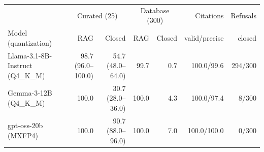 \begin{tabular}{lrrrrrr}
\toprule
 & \multicolumn{2}{c}{Curated (25)} & \multicolumn{2}{c}{Database (300)} & Citations & Refusals \\
Model (quantization) & RAG & Closed & RAG & Closed & valid/precise & closed \\
\midrule
Llama-3.1-8B-Instruct (Q4\_K\_M) & 98.7 (96.0--100.0) & 54.7 (48.0--64.0) & 99.7 & 0.7 & 100.0/99.6 & 294/300 \\
Gemma-3-12B (Q4\_K\_M) & 100.0 & 30.7 (28.0--36.0) & 100.0 & 4.3 & 100.0/97.4 & 8/300 \\
gpt-oss-20b (MXFP4) & 100.0 & 90.7 (88.0--96.0) & 100.0 & 7.0 & 100.0/100.0 & 0/300 \\
\bottomrule
\end{tabular}
